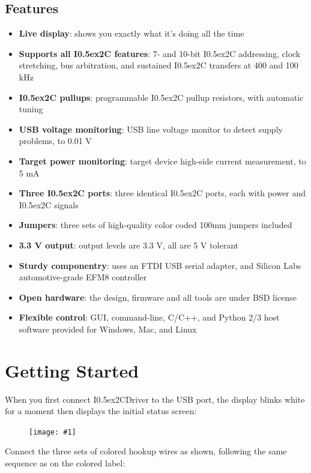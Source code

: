 \documentclass{article}
\newcommand{\two}{\raise0.5ex\hbox{\footnotesize{2}}}
\newcommand{\iic}{I\two{}C}
\newcommand{\iicdriver}{I\two{}CDriver}
\newcommand{\png}[1]{
\begin{figure}[H]
\begin{center}
\texttt{[image: \#1]}
\end{center}
\end{figure}
}
\begin{document}
\subsection{Features}
\begin{itemize}
\item \textbf{Live display}: shows you exactly what it's doing all the time  
\item \textbf{Supports all \iic{} features}: 7- and 10-bit \iic{} addressing, clock stretching, bus arbitration,
and sustained \iic{} transfers at 400 and 100 kHz  
\item \textbf{\iic{} pullups}: programmable \iic{} pullup resistors, with automatic tuning  
\item \textbf{USB voltage monitoring}: USB line voltage monitor to detect supply problems, to 0.01 V  
\item \textbf{Target power monitoring}: target device high-side current measurement, to 5 mA  
\item \textbf{Three \iic{} ports}: three identical \iic{} ports, each with power and \iic{} signals  
\item \textbf{Jumpers}: three sets of high-quality color coded 100mm jumpers included
\item \textbf{3.3 V output}: output levels are 3.3 V, all are 5 V tolerant  
\item \textbf{Sturdy componentry}: uses an FTDI USB serial adapter, and Silicon Labs automotive-grade EFM8 controller  
\item \textbf{Open hardware}: the design, firmware and all tools are under BSD license
\item \textbf{Flexible control}: GUI, command-line, C/C++, and Python 2/3 host software provided for Windows, Mac, and Linux  
\end{itemize}

\newpage
\section{Getting Started}

When you first connect \iicdriver{} to the USB port, the display blinks white for a moment
then displays the initial status screen:

\png{img/i2cdriver/i2c_driver_cabled}

Connect the three sets of colored hookup wires as shown, 
following the same sequence as on the colored label:

\end{document}
